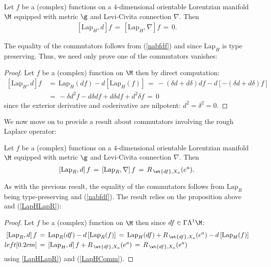 \documentclass[sections]{tjwNOTES}
\newcommand{\LapH}{\text{Lap}_{H}}
\newcommand{\LapR}{\text{Lap}_{R}}
\begin{document}
\begin{prop*}{}
	Let $f$ be a (complex) functions on a $4$-dimensional orientable Lorentzian manifold $\M$ equipped with metric $\g$ and Levi-Civita connection $\nabla$. Then
	\begin{align}\label{LapHComm}
		\left[\LapH,d\right]f \,=\, \left[\LapH,\nabla\right]f \,=\, 0.
	\end{align}
\end{prop*}

The equality of the commutators follows from (\ref{nabfdf}) and since $\LapH$ is type preserving. Thus, we need only prove one of the commutators vanishes:\\[0.2cm]

\begin{proof}
	Let $f$ be a (complex) function on $\M$ then by direct computation:
	\begin{align*}
		\left[\LapH,d\right]f &\,=\, \LapH(df) - d\left[\LapH(f)\right] \,=\, -(\delta d + d\delta)df - d\left[-(\delta d+d\delta)f\right] \\[0.2cm]
			&\,=\, -\delta d^{2}f - d\delta df + d\delta df +d^{2}\delta f \,=\, 0
	\end{align*}
	since the exterior derivative and coderivative are nilpotent: $d^{2}=\delta^{2}=0$.
\end{proof}

We now move on to provide a result about commutators involving the rough Laplace operator:
\begin{prop*}{}
	Let $f$ be a (complex) functions on a $4$-dimensional orientable Lorentzian manifold $\M$ equipped with metric $\g$ and Levi-Civita connection $\nabla$. Then
	\begin{align}\label{LapRComm}
		\left[\LapR,d\right]f \,=\, \left[\LapR,\nabla\right]f \,=\, R_{\,\wt{df},X_{a}}(e^{a}).
	\end{align}
\end{prop*}

As with the previous result, the equality of the commutators follows from $\LapR$ being type-preserving and (\ref{nabfdf}). The result relies on the proposition above and (\ref{LapHLapR}):\\[0.2cm]

\begin{proof}
	Let $f$ be a (complex) function on $\M$ then since $df\in\Gamma\Lambda^{1}\M$:
	\begin{align*}
		\left[\LapR,d\right]f &\,=\, \LapR(df) - d\left[\LapR(f)\right] \,=\, \LapH(df) + R_{\,\wt{df},X_{a}}(e^{a}) - d\left[\LapH(f)\right] \\left[0.2cm]
		&\,=\, \left[\LapH,d\right]f + R_{\,\wt{df},X_{a}}(e^{a}) \,=\, R_{\,\wt{df},X_{a}}(e^{a})
	\end{align*}
	using \ref{LapHLapR}) and (\ref{LapHComm}). 
\end{proof}
\end{document}
